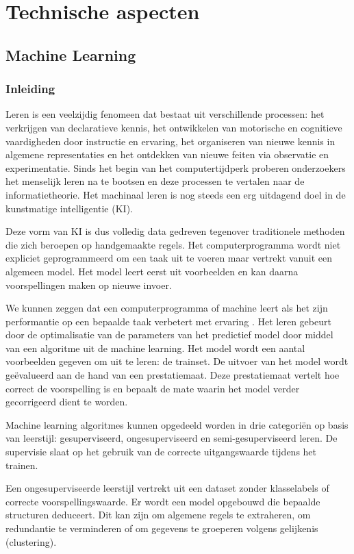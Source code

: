 \chapter{Technische aspecten}
\section{Machine Learning}
\subsection{Inleiding}
\npar Leren is een veelzijdig fenomeen dat bestaat uit  verschillende processen: het verkrijgen van declaratieve kennis, het ontwikkelen van motorische en cognitieve vaardigheden door instructie en ervaring, het organiseren van nieuwe kennis in algemene representaties en het ontdekken van nieuwe feiten via observatie en experimentatie.
\npar Sinds het begin van het computertijdperk proberen onderzoekers het menselijk leren na te bootsen en deze processen te vertalen naar de informatietheorie. Het machinaal leren is nog steeds een erg uitdagend doel in de kunstmatige intelligentie (KI).

\npar Deze vorm van KI is dus volledig data gedreven tegenover traditionele methoden die zich beroepen op handgemaakte regels. Het computerprogramma wordt niet expliciet geprogrammeerd om een taak uit te voeren maar vertrekt vanuit een algemeen model. Het model leert eerst uit voorbeelden en kan daarna voorspellingen maken op nieuwe invoer.

\npar We kunnen zeggen dat een computerprogramma of machine leert als het zijn performantie op een bepaalde taak verbetert met ervaring \cite{machine_overview}.  Het leren gebeurt door de optimalisatie van de parameters van het predictief model door middel van een algoritme uit de machine learning. Het model wordt een aantal voorbeelden gegeven om uit te leren: de trainset. De uitvoer van het model wordt ge\"evalueerd aan de hand van een prestatiemaat. Deze prestatiemaat vertelt hoe correct de voorspelling is en bepaalt de mate waarin het model verder gecorrigeerd dient te worden.

\npar Machine learning algoritmes kunnen opgedeeld worden in drie categori\"en op basis van leerstijl: gesuperviseerd, ongesuperviseerd en semi-gesuperviseerd leren. De supervisie slaat op het gebruik van de correcte uitgangswaarde tijdens het trainen.

\npar Een ongesuperviseerde leerstijl vertrekt uit een dataset zonder klasselabels of correcte voorspellingswaarde. Er wordt een model opgebouwd die bepaalde structuren deduceert. Dit kan zijn om algemene regels te extraheren, om redundantie te verminderen of om gegevens te groeperen volgens gelijkenis (clustering).

